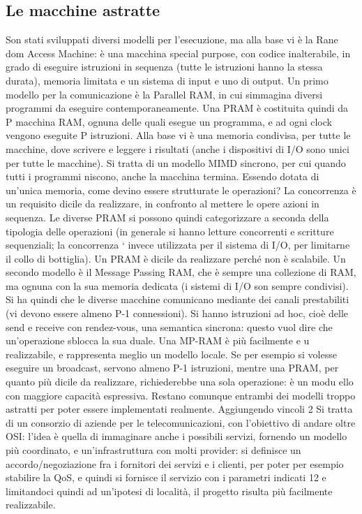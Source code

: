 \subsection{Le macchine astratte}
Son stati sviluppati diversi modelli per l'esecuzione, ma alla base vi è la Rane
dom Access Machine: è una macchina special purpose, con codice inalterabile,
in grado di eseguire istruzioni in sequenza (tutte le istruzioni hanno la stessa
durata), memoria limitata e un sistema di input e uno di output.
Un primo modello per la comunicazione è la Parallel RAM, in cui simmagina
diversi programmi da eseguire contemporaneamente. Una PRAM è costituita
quindi da P macchina RAM, ognuna delle quali esegue un programma, e ad ogni
clock vengono eseguite P istruzioni. Alla base vi è una memoria condivisa, per
tutte le macchine, dove scrivere e leggere i risultati (anche i dispositivi di I/O
sono unici per tutte le macchine). Si tratta di un modello MIMD sincrono, per
cui quando tutti i programmi niscono, anche la macchina termina. Essendo
dotata di un'unica memoria, come devino essere strutturate le operazioni? La
concorrenza è un requisito dicile da realizzare, in confronto al mettere le opere
azioni in sequenza. Le diverse PRAM si possono quindi categorizzare a seconda
della tipologia delle operazioni (in generale si hanno letture concorrenti e scritture sequenziali; la concorrenza `
invece utilizzata per il sistema di I/O, per
limitarne il collo di bottiglia). Un PRAM è dicile da realizzare perché non è
scalabile.
Un secondo modello è il Message Passing RAM, che è sempre una collezione
di RAM, ma ognuna con la sua memoria dedicata (i sistemi di I/O son sempre
condivisi). Si ha quindi che le diverse macchine comunicano mediante dei canali
prestabiliti (vi devono essere almeno P-1 connessioni). Si hanno istruzioni ad
hoc, cioè delle send e receive con rendez-vous, una semantica sincrona: questo
vuol dire che un'operazione sblocca la sua duale. Una MP-RAM è più facilmente
e u
realizzabile, e rappresenta meglio un modello locale. Se per esempio si volesse
eseguire un broadcast, servono almeno P-1 istruzioni, mentre una PRAM, per
quanto più dicile da realizzare, richiederebbe una sola operazione: è un modu
ello con maggiore capacità espressiva. Restano comunque entrambi dei modelli
troppo astratti per poter essere implementati realmente. Aggiungendo vincoli
2 Si tratta di un consorzio di aziende per le telecomunicazioni, con l'obiettivo di andare
oltre OSI: l'idea è quella di immaginare anche i possibili servizi, fornendo un modello più
coordinato, e un'infrastruttura con molti provider: si definisce un accordo/negoziazione fra i
fornitori dei servizi e i clienti, per poter per esempio stabilire la QoS, e quindi si fornisce il
servizio con i parametri indicati
12
e limitandoci quindi ad un'ipotesi di località, il progetto risulta più facilmente
realizzabile.
